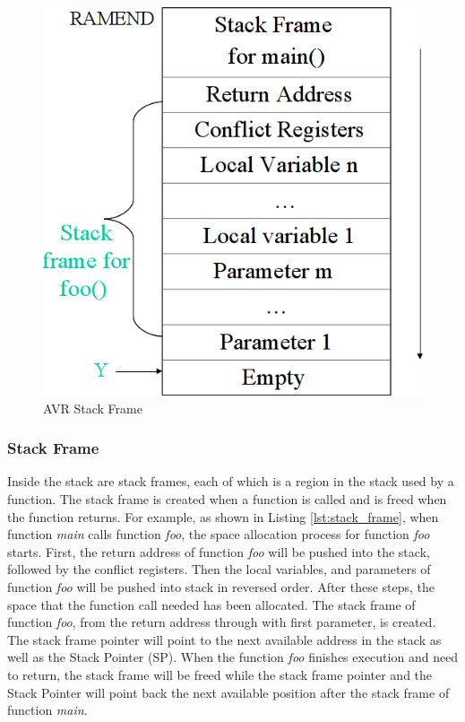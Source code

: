 \begin{figure}
\centering
\includegraphics[scale=0.3]{figures/stack_frame.png}
\caption{AVR Stack Frame}
\label{fig:stack_frame}
\end{figure}
\subsubsection{Stack Frame}
Inside the stack are stack frames, each of which is a region in the stack used by a function. The stack frame is created when a function is called and is freed when the function returns. For example, as shown in Listing \ref{lst:stack_frame}, when function \textit{main} calls function \textit{foo}, the space allocation process for function \textit{foo} starts. First, the return address of function \textit{foo} will be pushed into the stack, followed by the conflict registers. Then the local variables, and parameters of function \textit{foo} will be pushed into stack in reversed order. After these steps, the space that the function call needed has been allocated. The stack frame of function \textit{foo}, from the return address through with first parameter, is created. The stack frame pointer will point to the next available address in the stack as well as the Stack Pointer (SP). When the function \textit{foo} finishes execution and need to return, the stack frame will be freed while the stack frame pointer and the Stack Pointer will point back the next available position after the stack frame of function \textit{main}.


